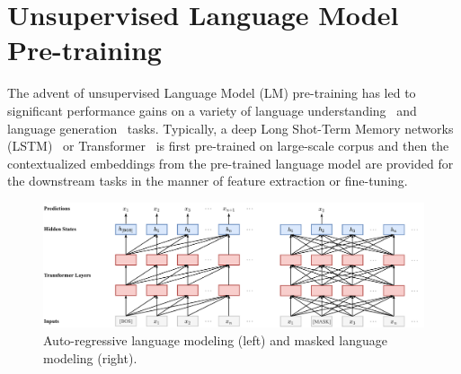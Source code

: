 \section{Unsupervised Language Model Pre-training}
The advent of unsupervised Language Model (LM) pre-training has led to significant performance gains on a variety of language understanding~\citep{radford2018improving,devlin-etal-2019-bert,yang2019xlnet,clark2020electra} and language generation~\citep{radford2019language,dong2019unified} tasks. Typically, a deep Long Shot-Term Memory networks (LSTM)~\citep{hochreiter1997long,peters-etal-2018-deep} or Transformer~\citep{vaswani2017attention} is first pre-trained on large-scale corpus and then the contextualized embeddings from the pre-trained language model are provided for the downstream tasks in the manner of feature extraction or fine-tuning.


\begin{figure}
    \centering
    \includegraphics[width=\textwidth]{fig/ptlm.pdf}
    \caption{Auto-regressive language modeling (left) and masked language modeling (right).}
    \label{fig:ptlm}
\end{figure}

